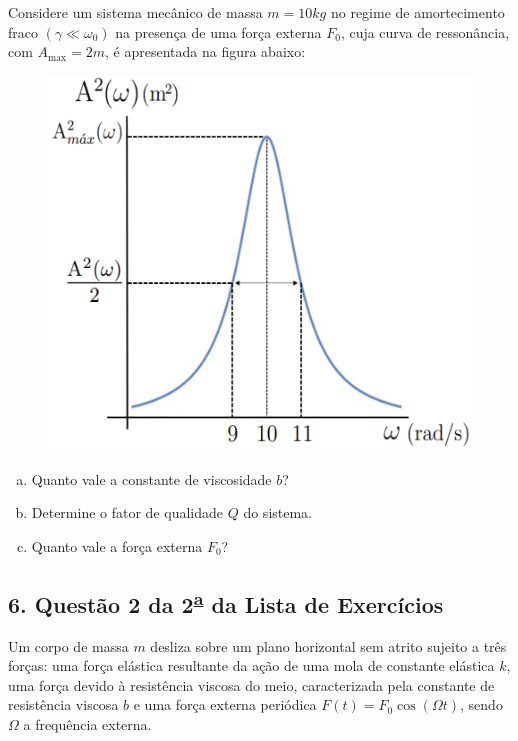 \documentclass[a4paper,10pt]{article}
\begin{document}
Considere um sistema mecânico de massa $m = 10 \unit{kg}$ no regime
de amortecimento fraco $(\gamma \ll \omega_0)$ na presença de uma força externa $F_0$, cuja curva de ressonância,
com $A_{\text{max}} = 2\unit{m}$, é apresentada na figura abaixo:
\begin{figure}[H]
\centering
\includegraphics[width=0.6\linewidth]{fig/grafico-A2-p2.png}
\label{fig:grafico-A2-p2}
\end{figure}

\begin{enumerate}[(a)]
\item Quanto vale a constante de viscosidade $b$?

\item Determine o fator de qualidade $Q$ do sistema.

\item Quanto vale a força externa $F_0$?
\end{enumerate}

\n

\subsection*{6. Questão 2 da 2\textsuperscript{\underline{a}} da Lista de Exercícios}

Um corpo de massa $m$ desliza sobre um plano horizontal sem atrito sujeito a três
forças: uma força elástica resultante da ação de uma mola de constante elástica
$k$, uma força devido à resistência viscosa do meio, caracterizada pela constante de
resistência viscosa $b$ e uma força externa periódica $F(t) = F_0 \cos(\Omega t)$, sendo $\Omega$ a
frequência externa.
\end{document}
